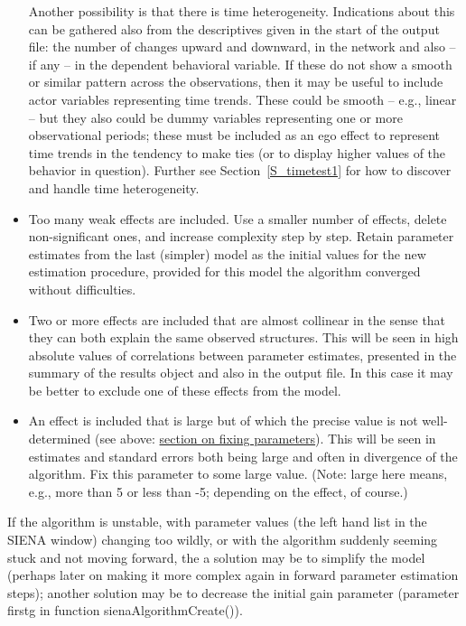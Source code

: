 \documentclass[a4paper,fleqn,11pt]{article}
\newcommand{\+}{\, + \,}
\newcommand{\sfn}[1]{\textsf{#1}}
\newcommand{\SI}{{\sf SIENA }}
\begin{document}
\begin{itemize}
      Another possibility is that there is time heterogeneity.
      Indications about this can be gathered also from the descriptives
      given in the start of the output file: the number of changes
      upward and downward, in the network and also -- if any -- in the
      dependent behavioral variable. If these do not show a smooth
      or similar pattern across the observations, then it may be useful
      to include actor variables representing time trends. These
      could be smooth -- e.g., linear -- but they also could be dummy variables
      representing one or more observational periods; these must be included
      as an ego effect to represent time trends in the tendency to make ties
      (or to display higher values of the behavior in question).
      Further see Section~\ref{S_timetest1} for how to discover and handle
      time heterogeneity.
\item Too many weak effects are included. Use a smaller number of effects,
      delete non-significant ones, and increase complexity step by step.
      Retain parameter estimates from the last
      (simpler) model as the initial values for the new estimation procedure,
      provided for this model the algorithm converged
      without difficulties.
\item Two or more effects are included that are almost collinear
      in the sense that they can both explain the same observed structures.
      This will be seen in high absolute values of
      correlations between parameter estimates, presented in the
      \sfn{summary} of the results object and also in the output file.
      In this case it may be better to exclude one of these effects from the model.
\item An effect is included that is large but of which the precise
      value is not well-determined (see above:
      \hyperlink{T_fix}{section on fixing parameters}).
      This will be seen in estimates and standard errors both being large
      and often in divergence of the algorithm.
      Fix this parameter to some large value.
      (Note: large here means, e.g., more than 5 or less than -5; depending
      on the effect, of course.)
\end{itemize}

If the algorithm is unstable, with parameter values (the left hand list
in the \SI window) changing too wildly, or with the algorithm
suddenly seeming stuck and not moving forward, the a solution may be
to simplify the model (perhaps later on making it more complex again
in forward parameter estimation steps); another solution may be
to decrease the initial gain parameter (parameter \textsf{firstg}
in function \textsf{sienaAlgorithmCreate()}).
\end{document}

